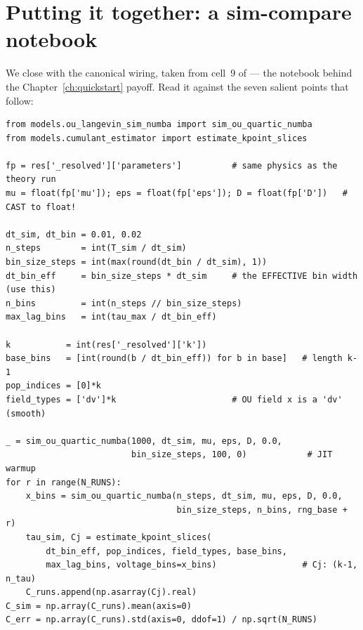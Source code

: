 \section{Putting it together: a sim-compare notebook}

We close with the canonical wiring, taken from cell~9 of
 --- the notebook
behind the Chapter~\ref{ch:quickstart} payoff. Read it against the seven salient
points that follow:

\begin{lstlisting}
from models.ou_langevin_sim_numba import sim_ou_quartic_numba
from models.cumulant_estimator import estimate_kpoint_slices

fp = res['_resolved']['parameters']          # same physics as the theory run
mu = float(fp['mu']); eps = float(fp['eps']); D = float(fp['D'])   # CAST to float!

dt_sim, dt_bin = 0.01, 0.02
n_steps        = int(T_sim / dt_sim)
bin_size_steps = int(max(round(dt_bin / dt_sim), 1))
dt_bin_eff     = bin_size_steps * dt_sim     # the EFFECTIVE bin width (use this)
n_bins         = int(n_steps // bin_size_steps)
max_lag_bins   = int(tau_max / dt_bin_eff)

k           = int(res['_resolved']['k'])
base_bins   = [int(round(b / dt_bin_eff)) for b in base]   # length k-1
pop_indices = [0]*k
field_types = ['dv']*k                       # OU field x is a 'dv' (smooth)

_ = sim_ou_quartic_numba(1000, dt_sim, mu, eps, D, 0.0,
                         bin_size_steps, 100, 0)            # JIT warmup
for r in range(N_RUNS):
    x_bins = sim_ou_quartic_numba(n_steps, dt_sim, mu, eps, D, 0.0,
                                  bin_size_steps, n_bins, rng_base + r)
    tau_sim, Cj = estimate_kpoint_slices(
        dt_bin_eff, pop_indices, field_types, base_bins,
        max_lag_bins, voltage_bins=x_bins)                 # Cj: (k-1, n_tau)
    C_runs.append(np.asarray(Cj).real)
C_sim = np.array(C_runs).mean(axis=0)
C_err = np.array(C_runs).std(axis=0, ddof=1) / np.sqrt(N_RUNS)
\end{lstlisting}

